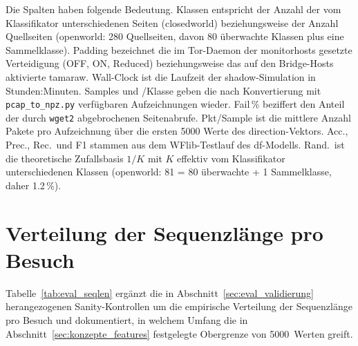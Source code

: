 Die Spalten haben folgende Bedeutung.
Klassen entspricht der Anzahl der vom Klassifikator unterschiedenen Seiten (\gls{closedworld}) beziehungsweise der Anzahl Quellseiten (\gls{openworld}: 280 Quellseiten, davon 80 überwachte Klassen plus eine Sammelklasse).
Padding bezeichnet die im Tor-Daemon der \gls{monitorhost}s gesetzte Verteidigung (OFF, ON, Reduced) beziehungsweise das auf den Bridge-Hosts aktivierte \gls{tamaraw}.
Wall-Clock ist die Laufzeit der \gls{shadow}-Simulation in Stunden:Minuten.
Samples und /Klasse geben die nach Konvertierung mit \texttt{pcap\_to\_npz.py} verfügbaren Aufzeichnungen wieder.
Fail\,\% beziffert den Anteil der durch \texttt{wget2} abgebrochenen Seitenabrufe.
Pkt/Sample ist die mittlere Anzahl Pakete pro Aufzeichnung über die ersten 5000 Werte des direction-Vektors.
Acc., Prec., Rec.\ und F1 stammen aus dem WFlib-Testlauf des \gls{df}-Modells.
Rand.\ ist die theoretische Zufallsbasis $1/K$ mit $K$ effektiv vom Klassifikator unterschiedenen Klassen (\gls{openworld}: 81 = 80 überwachte + 1 Sammelklasse, daher 1.2\,\%).

\section{Verteilung der Sequenzlänge pro Besuch}
\label{app:seqlen}

Tabelle~\ref{tab:eval_seqlen} ergänzt die in Abschnitt~\ref{sec:eval_validierung} herangezogenen Sanity-Kontrollen um die empirische Verteilung der Sequenzlänge pro Besuch und dokumentiert, in welchem Umfang die in Abschnitt~\ref{sec:konzepte_features} festgelegte Obergrenze von 5000~Werten greift.


